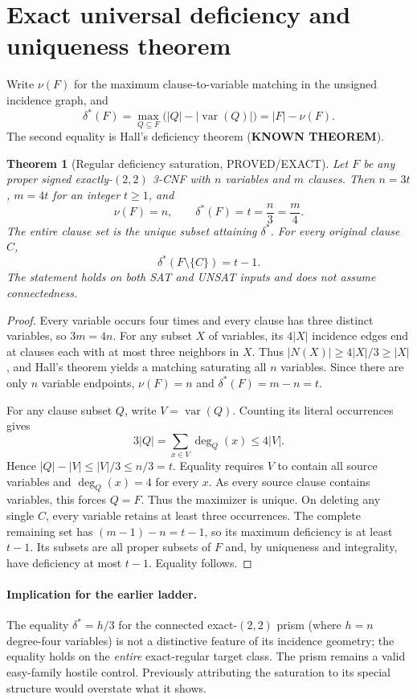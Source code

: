 \documentclass[11pt]{article}
\newtheorem{theorem}{Theorem}
\begin{document}
\section{Exact universal deficiency and uniqueness theorem}
Write $\nu(F)$ for the maximum clause-to-variable matching in the unsigned incidence graph, and
\[
\delta^*(F)=\max_{Q\subseteq F}\bigl(|Q|-|\operatorname{var}(Q)|\bigr)
=|F|-\nu(F).
\]
The second equality is Hall's deficiency theorem (\textbf{KNOWN THEOREM}).

\begin{theorem}[Regular deficiency saturation, PROVED/EXACT]
Let $F$ be any proper signed exactly-$(2,2)$ 3-CNF with $n$ variables and $m$ clauses. Then $n=3t$, $m=4t$ for an integer $t\ge1$, and
\[
\boxed{\nu(F)=n,\qquad \delta^*(F)=t=\frac n3=\frac m4.}
\]
The entire clause set is the unique subset attaining $\delta^*$.
For \emph{every} original clause $C$,
\[
\boxed{\delta^*(F\setminus\{C\})=t-1.}
\]
The statement holds on both SAT and UNSAT inputs and does not assume connectedness.
\end{theorem}
\begin{proof}
Every variable occurs four times and every clause has three distinct variables, so $3m=4n$.
For any subset $X$ of variables, its $4|X|$ incidence edges end at clauses each with at most three neighbors in $X$. Thus $|N(X)|\ge4|X|/3\ge|X|$, and Hall's theorem yields a matching saturating all $n$ variables. Since there are only $n$ variable endpoints, $\nu(F)=n$ and $\delta^*(F)=m-n=t$.

For any clause subset $Q$, write $V=\operatorname{var}(Q)$. Counting its literal occurrences gives
\[
3|Q|=\sum_{x\in V}\deg_Q(x)\le4|V|.
\]
Hence $|Q|-|V|\le |V|/3\le n/3=t$.
Equality requires $V$ to contain all source variables and $\deg_Q(x)=4$ for every $x$. As every source clause contains variables, this forces $Q=F$. Thus the maximizer is unique.
On deleting any single $C$, every variable retains at least three occurrences. The complete remaining set has $(m-1)-n=t-1$, so its maximum deficiency is at least $t-1$. Its subsets are all proper subsets of $F$ and, by uniqueness and integrality, have deficiency at most $t-1$. Equality follows.
\end{proof}
\paragraph{Implication for the earlier ladder.}
The equality $\delta^*=h/3$ for the connected exact-$(2,2)$ prism (where $h=n$ degree-four variables) is not a distinctive feature of its incidence geometry; the equality holds on the \emph{entire} exact-regular target class. The prism remains a valid easy-family hostile control. Previously attributing the saturation to its special structure would overstate what it shows.
\end{document}
